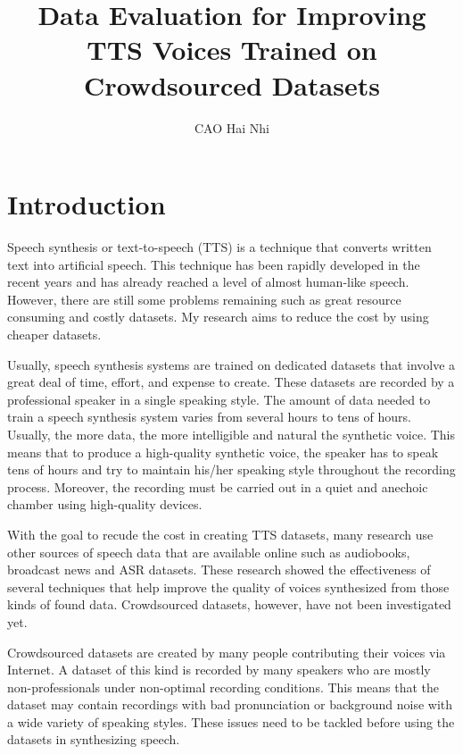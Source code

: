 \documentclass[12pt]{article}
\title{Data Evaluation for Improving TTS Voices Trained on Crowdsourced Datasets}
\author{CAO Hai Nhi}
\begin{document}
\titlepage
\cmemberspage
\firstabstract
%
%
\toc
\newpage
\listoffigures

\listoftables
%
%
\newpage


\section{Introduction}
Speech synthesis or text-to-speech (TTS) is a technique that converts written text into artificial speech. This technique has been rapidly developed in the recent years and has already reached a level of almost human-like speech. However, there are still some problems remaining such as great resource consuming and costly datasets. My research aims to reduce the cost by using cheaper datasets.

Usually, speech synthesis systems are trained on dedicated datasets that involve a great deal of time, effort, and expense to create. These datasets are recorded by a professional speaker in a single speaking style. The amount of data needed to train a speech synthesis system varies from several hours to tens of hours. Usually, the more data, the more intelligible and natural the synthetic voice. This means that to produce a high-quality synthetic voice, the speaker has to speak tens of hours and try to maintain his/her speaking style throughout the recording process. Moreover, the recording must be carried out in a quiet and anechoic chamber using high-quality devices.

With the goal to recude the cost in creating TTS datasets, many research use other sources of speech data that are available online such as audiobooks, broadcast news and ASR datasets. These research showed the effectiveness of several techniques that help improve the quality of voices synthesized from those kinds of found data. Crowdsourced datasets, however, have not been investigated yet.

Crowdsourced datasets are created by many people contributing their voices via Internet. A dataset of this kind is recorded by many speakers who are mostly non-professionals under non-optimal recording conditions. This means that the dataset may contain recordings with bad pronunciation or background noise with a wide variety of speaking styles. These issues need to be tackled before using the datasets in synthesizing speech.
\end{document}

